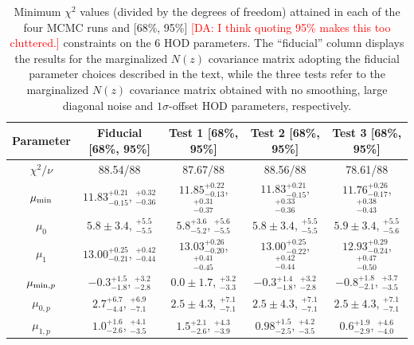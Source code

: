 \documentclass[a4paper,11pt]{article}
\newcommand{\da}[1]{{\textcolor{red}{[DA: #1]}}}
\begin{document}
    \begin{table}
      \begin{center}
        \begin{tabular}{c | c c c c} 
          \hline\hline
          Parameter & Fiducial [68\%, 95\%] & Test 1 [68\%, 95\%] & Test 2 [68\%, 95\%] & Test 3 [68\%, 95\%] \\ [0.5ex] 
          \hline
          $\chi^2/\nu$ & 88.54/88 & 87.67/88 & 88.56/88 & 78.61/88 \\
          $\mu_{\rm min}$ & $11.83^{+0.21}_{-0.15}$, $^{+0.32}_{-0.36}$ & $11.85^{+0.22}_{-0.13}$, $^{+0.31}_{-0.37}$ & $11.83^{+0.21}_{-0.15}$, $^{+0.33}_{-0.36}$ & $11.76^{+0.26}_{-0.17}$, $^{+0.38}_{-0.43}$ \\ [1ex]
          $\mu_{0}$ & $5.8\pm 3.4$, $^{+5.5}_{-5.5}$ & $5.8^{+3.6}_{-5.2}$, $^{+5.6}_{-5.5}$ & $5.8\pm 3.4$, $^{+5.5}_{-5.5}$ & $5.9\pm 3.4$, $^{+5.5}_{-5.6}$ \\ [1ex]
          $\mu_{1}$ & $13.00^{+0.25}_{-0.21}$, $^{+0.42}_{-0.44}$ & $13.03^{+0.26}_{-0.20}$, $^{+0.41}_{-0.45}$ & $13.00^{+0.25}_{-0.22}$, $^{+0.42}_{-0.44}$ & $12.93^{+0.29}_{-0.24}$, $^{+0.47}_{-0.50}$ \\ [1ex]
          $\mu_{{\rm min},p}$ & $-0.3^{+1.5}_{-1.8}$, $^{+3.2}_{-2.8}$ & $0.0\pm 1.7$, $^{+3.2}_{-3.3}$ & $-0.3^{+1.4}_{-1.8}$, $^{+3.2}_{-2.8}$ & $-0.8^{+1.8}_{-2.1}$, $^{+3.7}_{-3.5}$ \\ [1ex]
          $\mu_{0,p}$ & $2.7^{+6.7}_{-4.4}$, $^{+6.9}_{-7.1}$ & $2.5\pm 4.3$, $^{+7.1}_{-7.1}$ & $2.5\pm 4.3$, $^{+7.1}_{-7.1}$ & $2.5\pm 4.3$, $^{+7.1}_{-7.1}$ \\ [1ex]
          $\mu_{1,p}$ & $1.0^{+1.6}_{-2.6}$, $^{+4.1}_{-3.5}$ & $1.5^{+2.1}_{-2.6}$, $^{+4.3}_{-3.9}$ & $0.98^{+1.5}_{-2.5}$, $^{+4.2}_{-3.5}$ & $0.6^{+1.9}_{-2.9}$, $^{+4.6}_{-4.0}$ \\ [1ex]
          \hline
          \hline
        \end{tabular}
      \end{center}
      \caption{Minimum $\chi^2$ values (divided by the degrees of freedom) attained in each of the four MCMC runs and [68\%, 95\%] \da{I think quoting 95\% makes this too cluttered.} constraints on the 6 HOD parameters. The ``fiducial'' column displays the results for the marginalized $N(z)$ covariance matrix adopting the fiducial parameter choices described in the text, while the three tests refer to the marginalized $N(z)$ covariance matrix obtained with no smoothing, large diagonal noise and $1\sigma$-offset HOD parameters, respectively.}\label{tab:chi2_tests}
    \end{table}
\end{document}
